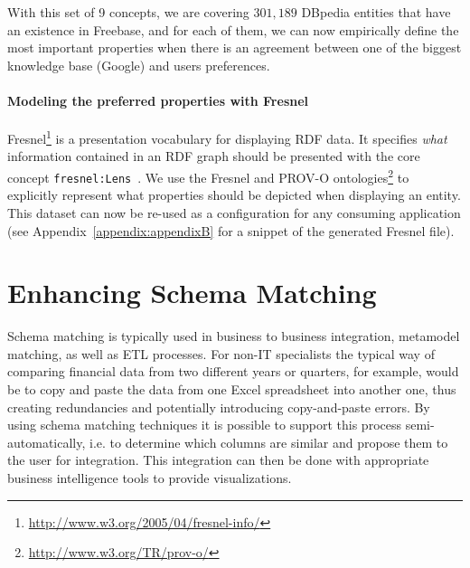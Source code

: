 \begin{table}[!htp]
\end{table}\normalsize

With this set of 9 concepts, we are covering $301,189$ DBpedia entities that have an existence in Freebase, and for each of them, we can now empirically define the most important properties when there is an agreement between one of the biggest knowledge base (Google) and users preferences.

\paragraph{\textbf{Modeling the preferred properties with Fresnel\\}}

Fresnel\footnote{\url{http://www.w3.org/2005/04/fresnel-info/}} is a presentation vocabulary for displaying RDF data. It specifies \textit{what} information contained in an RDF graph should be presented with the core concept \texttt{fresnel:Lens}~\cite{Pietriga:ISWC:06}. We use the Fresnel and PROV-O ontologies\footnote{\url{http://www.w3.org/TR/prov-o/}} to explicitly represent what properties should be depicted when displaying an entity. This dataset can now be re-used as a configuration for any consuming application (see Appendix~\ref{appendix:appendixB} for a snippet of the generated Fresnel file).


\section{Enhancing Schema Matching}

Schema matching is typically used in business to business integration, metamodel matching, as well as ETL processes. For non-IT specialists the typical way of comparing financial data from two different years or quarters, for example, would be to copy and paste the data from one Excel spreadsheet into another one, thus creating redundancies and potentially introducing copy-and-paste errors. By using schema matching techniques it is possible to support this process semi-automatically, i.e. to determine which columns are similar and propose them to the user for integration. This integration can then be done with appropriate business intelligence tools to provide visualizations.

